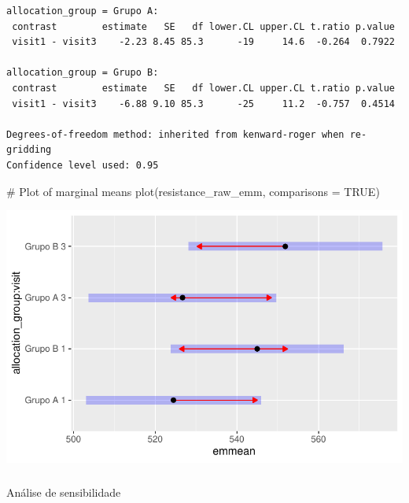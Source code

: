 \documentclass[
  12pt,
]{article}
\makeatletter
\let\oldsubparagraph\subparagraph
\renewcommand{\subparagraph}{
    \@ifstar
      \xxxSubParagraphStar
      \xxxSubParagraphNoStar
  }
\newcommand{\xxxSubParagraphStar}[1]{\oldsubparagraph*{#1}\mbox{}}
\newcommand{\xxxSubParagraphNoStar}[1]{\oldsubparagraph{#1}\mbox{}}
\newenvironment{Shaded}{\begin{snugshade}}{\end{snugshade}}
\newcommand{\AttributeTok}[1]{\textcolor[rgb]{0.40,0.45,0.13}{#1}}
\newcommand{\CommentTok}[1]{\textcolor[rgb]{0.37,0.37,0.37}{#1}}
\newcommand{\ConstantTok}[1]{\textcolor[rgb]{0.56,0.35,0.01}{#1}}
\newcommand{\FunctionTok}[1]{\textcolor[rgb]{0.28,0.35,0.67}{#1}}
\newcommand{\NormalTok}[1]{\textcolor[rgb]{0.00,0.23,0.31}{#1}}
\makeatother
\begin{document}
\begin{verbatim}
allocation_group = Grupo A:
 contrast        estimate   SE   df lower.CL upper.CL t.ratio p.value
 visit1 - visit3    -2.23 8.45 85.3      -19     14.6  -0.264  0.7922

allocation_group = Grupo B:
 contrast        estimate   SE   df lower.CL upper.CL t.ratio p.value
 visit1 - visit3    -6.88 9.10 85.3      -25     11.2  -0.757  0.4514

Degrees-of-freedom method: inherited from kenward-roger when re-gridding 
Confidence level used: 0.95 
\end{verbatim}

\begin{Shaded}
\begin{Highlighting}[]
\CommentTok{\# Plot of marginal means}
\FunctionTok{plot}\NormalTok{(resistance\_raw\_emm, }\AttributeTok{comparisons =} \ConstantTok{TRUE}\NormalTok{)}
\end{Highlighting}
\end{Shaded}

\includegraphics{Outcomes_files/figure-pdf/resistance_raw_emm-1.pdf}

\subparagraph{Análise de
sensibilidade}\label{anuxe1lise-de-sensibilidade-19}
\end{document}
